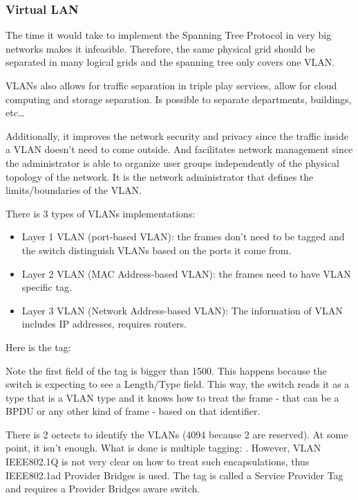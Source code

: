 \subsubsection{Virtual LAN}
The time it would take to implement the Spanning Tree Protocol in very big networks makes it infeasible. Therefore, the same physical grid should be separated in many logical grids and the spanning tree only covers one VLAN.


VLANs also allows for traffic separation in triple play services, allow for cloud computing and storage separation. Is possible to separate departments, buildings, etc\dots



Additionally, it improves the network security and privacy since the traffic inside a VLAN doesn't need to come outside. And facilitates network management since the administrator is able to organize user groups independently of the physical topology of the network. It is the network administrator that defines the limits/boundaries of the VLAN. 


There is 3 types of VLANs implementations:
\begin{itemize}
    \item Layer 1 VLAN (port-based VLAN): the frames don't need to be tagged and the switch distinguish VLANs based on the ports it come from.
    \item Layer 2 VLAN (MAC Address-based VLAN): the frames need to have VLAN specific tag.
    \item Layer 3 VLAN (Network Address-based VLAN): The information of VLAN includes IP addresses, requires routers.
\end{itemize}


Here is the tag:

Note the first field of the tag is bigger than 1500. This happens because the switch is expecting to see a Length/Type field. This way, the switch reads it as a type that is a VLAN type and it knows how to treat the frame - that can be a BPDU or any other kind of frame - based on that identifier.

There is 2 octects to identify the VLANs (4094 because 2 are reserved). At some point, it isn't enough. What is done is multiple tagging: .
However, VLAN IEEE802.1Q is not very clear on how to treat such encapsulations, thus IEEE802.1ad Provider Bridges is used. The tag is called a Service Provider Tag and requires a Provider Bridges aware switch.

